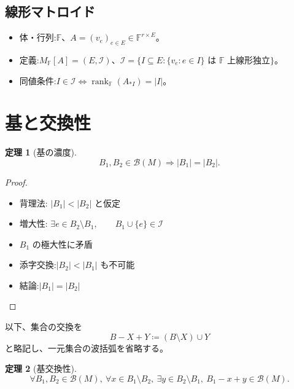 \documentclass[a4paper, 11pt, dvipdfmx]{jsarticle}
\newtheorem{theorem}{定理}
\theoremstyle{definition}
\begin{document}
\subsection[線形マトロイド]{線形マトロイド~\citep{s8}}
\label{sec:linear-matroid}

\begin{itemize}
  \item 体・行列:$\mathbb{F}$、$A = (v_e)_{e \in E} \in \mathbb{F}^{r \times E}$。
  \item 定義:$M_{\mathbb{F}}[A] = (E, \mathcal{I})$、$\mathcal{I} = \{I \subseteq E : \{v_e : e \in I\} \text{ は } \mathbb{F} \text{ 上線形独立}\}$。
  \item 同値条件:$I \in \mathcal{I} \Longleftrightarrow \operatorname{rank}_{\mathbb{F}}(A_{\ast I}) = \lvert I \rvert$。
\end{itemize}

\section{基と交換性}
\label{sec:bases-and-exchange}

\begin{theorem}[基の濃度]
\label{thm:bases-equal-size}
\begin{equation*}
  B_1, B_2 \in \mathcal{B}(M)
  \Longrightarrow
  \lvert B_1 \rvert = \lvert B_2 \rvert.
\end{equation*}
\end{theorem}

\begin{proof}
\begin{itemize}
  \item 背理法: $\lvert B_1 \rvert < \lvert B_2 \rvert$ と仮定
  \item 増大性: $\exists e \in B_2 \setminus B_1,\qquad B_1 \cup \{e\} \in \mathcal{I}$
  \item $B_1$ の極大性に矛盾
  \item 添字交換:$\lvert B_2 \rvert < \lvert B_1 \rvert$ も不可能
  \item 結論:$\lvert B_1 \rvert = \lvert B_2 \rvert$
\end{itemize}
\end{proof}

以下、集合の交換を
\begin{equation*}
  B - X + Y \coloneqq (B \setminus X) \cup Y
\end{equation*}
と略記し、一元集合の波括弧を省略する。

\begin{theorem}[基交換性]
\label{thm:basis-exchange}
\begin{equation*}
  \forall B_1, B_2 \in \mathcal{B}(M),\
  \forall x \in B_1 \setminus B_2,\
  \exists y \in B_2 \setminus B_1,\
  B_1 - x + y \in \mathcal{B}(M).
\end{equation*}
\end{theorem}
\end{document}
